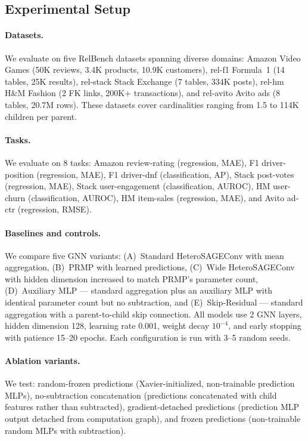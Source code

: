 \documentclass[11pt,letterpaper]{article}
\begin{document}
\subsection{Experimental Setup}

\paragraph{Datasets.} We evaluate on five RelBench \citep{Robinson2024} datasets spanning diverse domains: Amazon Video Games (50K reviews, 3.4K products, 10.9K customers), rel-f1 Formula~1 (14 tables, 25K results), rel-stack Stack Exchange (7 tables, 334K posts), rel-hm H\&M Fashion (2 FK links, 200K+ transactions), and rel-avito Avito ads (8 tables, 20.7M rows). These datasets cover cardinalities ranging from 1.5 to 114K children per parent.

\paragraph{Tasks.} We evaluate on 8 tasks: Amazon review-rating (regression, MAE), F1 driver-position (regression, MAE), F1 driver-dnf (classification, AP), Stack post-votes (regression, MAE), Stack user-engagement (classification, AUROC), HM user-churn (classification, AUROC), HM item-sales (regression, MAE), and Avito ad-ctr (regression, RMSE).

\paragraph{Baselines and controls.} We compare five GNN variants: (A)~Standard HeteroSAGEConv with mean aggregation, (B)~PRMP with learned predictions, (C)~Wide HeteroSAGEConv with hidden dimension increased to match PRMP's parameter count, (D)~Auxiliary MLP --- standard aggregation plus an auxiliary MLP with identical parameter count but no subtraction, and (E)~Skip-Residual --- standard aggregation with a parent-to-child skip connection. All models use 2 GNN layers, hidden dimension 128, learning rate 0.001, weight decay $10^{-4}$, and early stopping with patience 15--20 epochs. Each configuration is run with 3--5 random seeds.

\paragraph{Ablation variants.} We test: random-frozen predictions (Xavier-initialized, non-trainable prediction MLPs), no-subtraction concatenation (predictions concatenated with child features rather than subtracted), gradient-detached predictions (prediction MLP output detached from computation graph), and frozen predictions (non-trainable random MLPs with subtraction).
\end{document}
